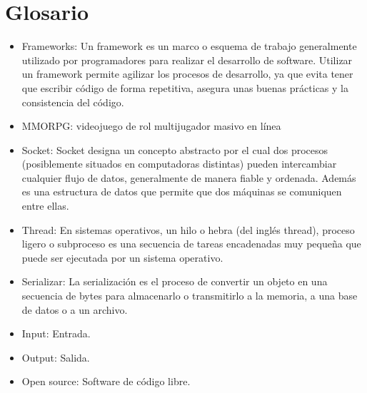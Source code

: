 \section{Glosario}
\begin{itemize}
    \item Frameworks: Un framework es un marco o esquema de trabajo generalmente utilizado por programadores para realizar el desarrollo de software. Utilizar un framework permite agilizar los procesos de desarrollo, ya que evita tener que escribir código de forma repetitiva, asegura unas buenas prácticas y la consistencia del código.
    \item MMORPG: videojuego de rol multijugador masivo en línea
    \item Socket: Socket designa un concepto abstracto por el cual dos procesos (posiblemente situados en computadoras distintas) pueden intercambiar cualquier flujo de datos, generalmente de manera fiable y ordenada. Además es una estructura de datos que permite que dos máquinas se comuniquen entre ellas.
    \item Thread: En sistemas operativos, un hilo o hebra (del inglés thread), proceso ligero o subproceso es una secuencia de tareas encadenadas muy pequeña que puede ser ejecutada por un sistema operativo.
    \item Serializar: La serialización es el proceso de convertir un objeto en una secuencia de bytes para almacenarlo o transmitirlo a la memoria, a una base de datos o a un archivo. 
    \item Input: Entrada.
    \item Output: Salida.
    \item Open source: Software de código libre.
\end{itemize}
